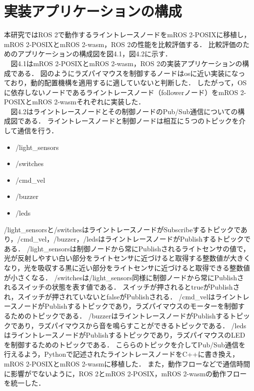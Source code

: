 \section{実装アプリケーションの構成}
本研究ではROS 2で動作するライントレースノードをmROS 2-POSIXに移植し，mROS 2-POSIXとmROS 2-wasm，ROS 2の性能を比較評価する．
比較評価のためのアプリケーションの構成図を図4.1，図4.2に示す．
\\　図4.1はmROS 2-POSIXとmROS 2-wasm，ROS 2の実装アプリケーションの構成である．
図のようにラズパイマウスを制御するノードはosに近い実装になっており，動的配置機構を適用するに適していないと判断した．
したがって，OSに依存しないノードであるライントレースノード（followerノード）をmROS 2-POSIXとmROS 2-wasmそれぞれに実装した．
\\　図4.2はライントレースノードとその制御ノードのPub/Sub通信についての構成図である．
ライントレースノードと制御ノードは相互に５つのトピックを介して通信を行う．
\begin{itemize}
    \item /light\_sensors
    \item /switches
    \item /cmd\_vel
    \item /buzzer
    \item /leds
\end{itemize}
/light\_sensorsと/switchesはライントレースノードがSubscribeするトピックであり，/cmd\_vel，/buzzer，/ledsはライントレースノードがPublishするトピックである．
/light\_sensorsは制御ノードから常にPublishされるライトセンサの値で，光が反射しやすい白い部分をライトセンサに近づけると取得する整数値が大きくなり，光を吸収する黒に近い部分をライトセンサに近づけると取得できる整数値が小さくなる．
/switchesは/light\_sensors同様に制御ノードから常にPublishされるスイッチの状態を表す値である．
スイッチが押されるとtrueがPublishされ，スイッチが押されていないとfalseがPublishされる．
/cmd\_velはライントレースノードがPublishするトピックであり，ラズパイマウスのモーターを制御するためのトピックである．
/buzzerはライントレースノードがPublishするトピックであり，ラズパイマウスから音を鳴らすことができるトピックである．
/ledsはライントレースノードがPublishするトピックであり，ラズパイマウスのLEDを制御するためのトピックである．
こららのトピックを介してPub/Sub通信を行えるよう，Pythonで記述されたライントレースノードをC++に書き換え，mROS 2-POSIXとmROS 2-wasmに移植した．
また，動作フローなどで通信時間に影響がでないように，ROS 2とmROS 2-POSIX，mROS 2-wasmの動作フローを統一した．

